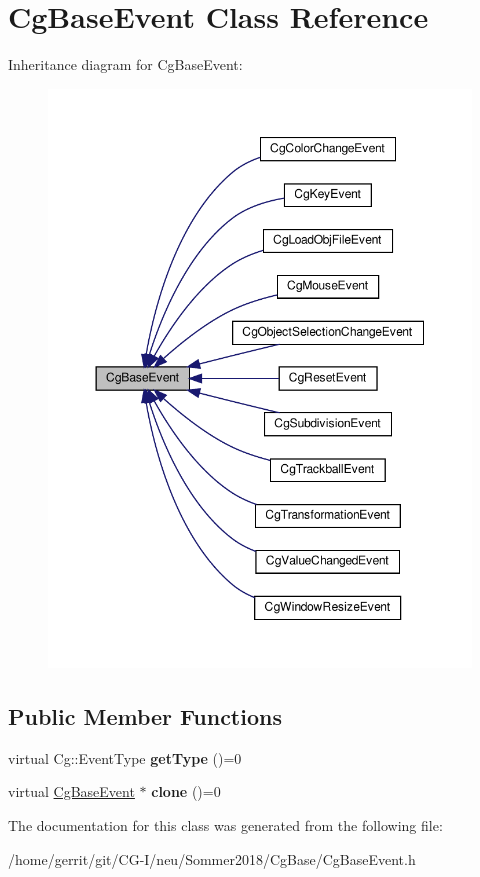 \hypertarget{class_cg_base_event}{}\section{Cg\+Base\+Event Class Reference}
\label{class_cg_base_event}


Inheritance diagram for Cg\+Base\+Event\+:
\nopagebreak
\begin{figure}[H]
\begin{center}
\leavevmode
\includegraphics[width=350pt]{class_cg_base_event__inherit__graph}
\end{center}
\end{figure}
\subsection*{Public Member Functions}
\begin{DoxyCompactItemize}
\item 
\mbox{\label{class_cg_base_event_af551ba08886d7b16eea9c58d0c44991a}} 
virtual Cg\+::\+Event\+Type {\bfseries get\+Type} ()=0
\item 
\mbox{\label{class_cg_base_event_a47e7710d3ed0c7fac6a13e8eabceb819}} 
virtual \hyperlink{class_cg_base_event}{Cg\+Base\+Event} $\ast$ {\bfseries clone} ()=0
\end{DoxyCompactItemize}


The documentation for this class was generated from the following file\+:\begin{DoxyCompactItemize}
\item 
/home/gerrit/git/\+C\+G-\/\+I/neu/\+Sommer2018/\+Cg\+Base/Cg\+Base\+Event.\+h\end{DoxyCompactItemize}
